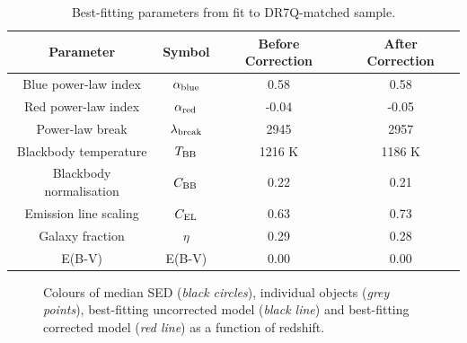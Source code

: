 \begin{table}
  \centering
  \begin{tabular}{c c c c}
    \hline 
    Parameter & Symbol & Before Correction & After Correction \\
    \hline 
    Blue power-law index & $\alpha_{\rm blue}$ & 0.58 & 0.58 \\
    Red power-law index & $\alpha_{\rm red}$ & -0.04 & -0.05 \\
    Power-law break & $\lambda_{\rm break}$ & 2945 & 2957 \\
    Blackbody temperature & $T_{\rm BB}$ & 1216 K & 1186 K \\
    Blackbody normalisation & $C_{\rm BB}$ & 0.22 & 0.21 \\
    Emission line scaling & $C_{\rm EL}$  & 0.63 &  0.73 \\
    Galaxy fraction & $\eta$ & 0.29 & 0.28 \\
    E(B-V) & E(B-V) & 0.00 & 0.00 \\
    \hline
  \end{tabular}
  \caption{Best-fitting parameters from fit to DR7Q-matched sample.}
  \label{tab:params}
\end{table}

\begin{figure}
\caption{Colours of median SED ({\it black circles}), individual objects ({\it grey points}), best-fitting uncorrected model ({\it black line}) and best-fitting corrected model ({\it red line}) as a function of redshift.}
  \label{fig:color_1}
\end{figure} 


